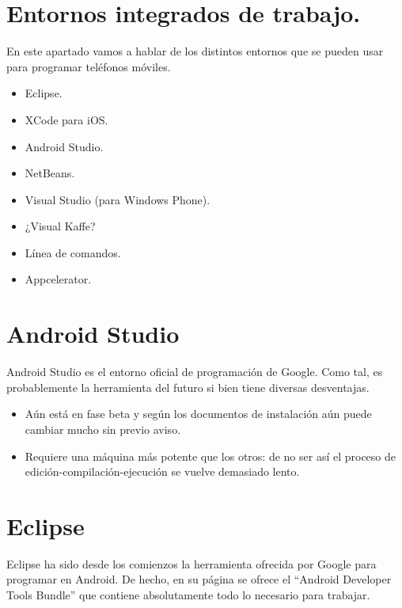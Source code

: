 \documentclass[a4paper,12pt,spanish]{sphinxmanual}
\begin{document}
\section{Entornos integrados de trabajo.}
\label{tema1:entornos-integrados-de-trabajo}
En este apartado vamos a hablar de los distintos entornos que se pueden usar para programar teléfonos móviles.
\begin{itemize}
\item {} 
Eclipse.

\item {} 
XCode para iOS.

\item {} 
Android Studio.

\item {} 
NetBeans.

\item {} 
Visual Studio (para Windows Phone).

\item {} 
¿Visual Kaffe?

\item {} 
Línea de comandos.

\item {} 
Appcelerator.

\end{itemize}


\section{Android Studio}
\label{tema1:android-studio}
Android Studio es el entorno oficial de programación de Google. Como tal, es probablemente la herramienta del futuro si bien tiene diversas desventajas.
\begin{itemize}
\item {} 
Aún está en fase beta y según los documentos de instalación aún puede cambiar mucho sin previo aviso.

\item {} 
Requiere una máquina más potente que los otros: de no ser así el proceso de edición-compilación-ejecución se vuelve demasiado lento.

\end{itemize}


\section{Eclipse}
\label{tema1:eclipse}
Eclipse ha sido desde los comienzos la herramienta ofrecida por Google para programar en Android. De hecho, en su página se ofrece el ``Android Developer Tools Bundle'' que contiene absolutamente todo lo necesario para trabajar.
\end{document}
